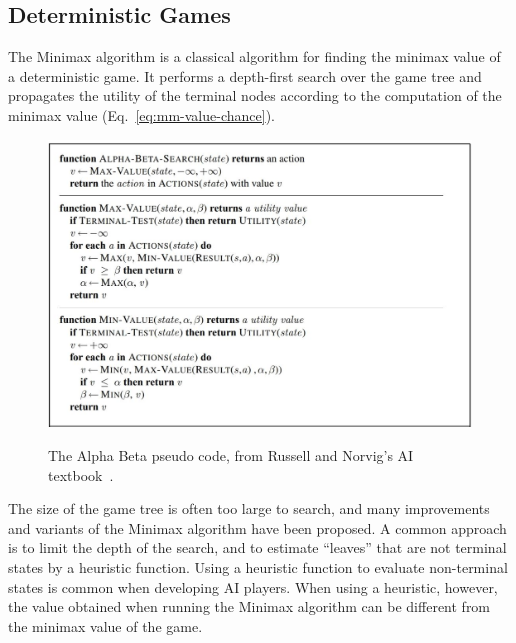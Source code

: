 \documentclass[letterpaper]{article} %
\newcommand{\MM}{\mathit{V}}
\begin{document}
\subsection{Deterministic Games}
The Minimax algorithm is a classical algorithm for finding the minimax value of a deterministic game. It performs a depth-first search over the game tree and propagates the utility of the terminal nodes according to the computation of the minimax value (Eq.~\ref{eq:mm-value-chance}). 

\begin{figure}
\includegraphics[width=\columnwidth]{AlphaBetaCode.JPG}
\label{fig:alpha-beta-code}
\caption{The Alpha Beta pseudo code, from Russell and Norvig's AI textbook~\cite{russell2016artificial}.}
\end{figure}

The size of the game tree is often too large to search, and many improvements and variants of the Minimax algorithm have been proposed. A common approach is to limit the depth of the search, and to estimate ``leaves'' that are not terminal states by a heuristic function. Using a heuristic function to evaluate non-terminal states is common when developing AI players. When using a heuristic, however, the value obtained when running the Minimax algorithm can be different from the minimax value of the game. 
\end{document}
